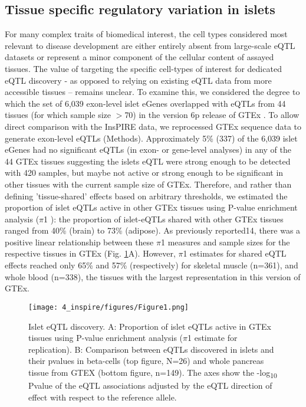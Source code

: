 \subsection{Tissue specific regulatory variation in islets}
For many complex traits of biomedical interest, the cell types considered most relevant to disease development are either entirely absent from large-scale eQTL datasets or represent a minor component of the cellular content of assayed tissues. The value of targeting the specific cell-types of interest for dedicated eQTL discovery - as opposed to relying on existing eQTL data from more accessible tissues – remains unclear. To examine this, we considered the degree to which the set of 6,039 exon-level islet eGenes overlapped with eQTLs from 44 tissues (for which sample size $>$70) in the version 6p release of GTEx \cite{gtexconsortiumGeneticEffectsGene2017}. To allow direct comparison with the InsPIRE data, we reprocessed GTEx sequence data to generate exon-level eQTLs (Methods). Approximately 5\% (337) of the 6,039 islet eGenes had no significant eQTLs (in exon- or gene-level analyses) in any of the 44 GTEx tissues suggesting the islets eQTL were strong enough to be detected with 420 samples, but maybe not active or strong enough to be significant in other tissues with the current sample size of GTEx. Therefore, and rather than defining 'tissue-shared' effects based on arbitrary thresholds, we estimated the proportion of islet eQTLs active in other GTEx tissues using P-value enrichment analysis ($\pi$1 \cite{storeyDirectApproachFalse2002}): the proportion of islet-eQTLs shared with other GTEx tissues ranged from 40\% (brain) to 73\% (adipose). As previously reported14, there was a positive linear relationship between these $\pi$1 measures and sample sizes for the respective tissues in GTEx (Fig. \ref{fig:c4_f1}A). However, $\pi$1 estimates for shared eQTL effects reached only 65\% and 57\% (respectively) for skeletal muscle (n=361), and whole blood (n=338), the tissues with the largest representation in this version of GTEx. \\

\begin{figure}
    \centering
    \texttt{[image: 4\_inspire/figures/Figure1.png]}
    \caption[Islet eQTL discovery]{Islet eQTL discovery. A: Proportion of islet eQTLs active in GTEx tissues using P-value enrichment analysis ($\pi$1 estimate for replication). B: Comparison between eQTLs discovered in islets and their pvalues in beta-cells (top figure, N=26) and whole pancreas tissue from GTEX (bottom figure, n=149). The axes show the -log\textsubscript{10} Pvalue of the eQTL associations adjusted by the eQTL direction of effect with respect to the reference allele.}
    \label{fig:c4_f1}
\end{figure}

